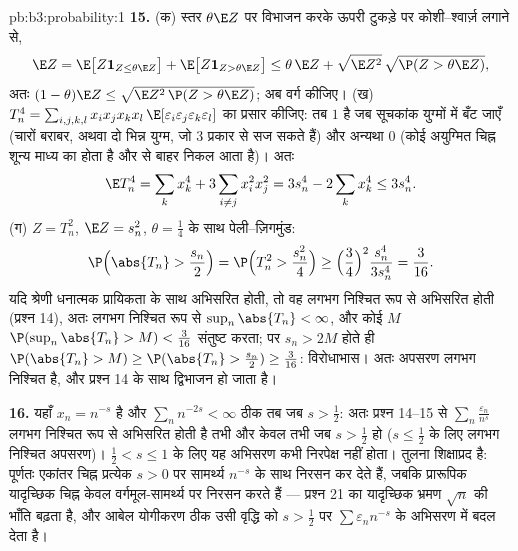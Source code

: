 \begin{solution}{pb:b3:probability:1}
\textbf{15.} (क) स्तर $\theta\E Z$ पर विभाजन करके ऊपरी
टुकड़े पर कोशी--श्वार्ज़ लगाने से,
\[
\E Z = \E\bigl[Z\mathbf 1_{Z \leq \theta\E Z}\bigr] +
\E\bigl[Z\mathbf 1_{Z > \theta\E Z}\bigr]
\leq \theta\,\E Z + \sqrt{\E Z^2}\,
\sqrt{\P(Z > \theta\E Z)} ,
\]
अतः $(1 - \theta)\E Z \leq \sqrt{\E Z^2\,\P(Z > \theta\E
Z)}$; अब वर्ग कीजिए। (ख) $T_n^4 =
\sum_{i,j,k,l}x_ix_jx_kx_l\,
\E[\varepsilon_i\varepsilon_j\varepsilon_k\varepsilon_l]$
का प्रसार कीजिए:  तब $1$ है जब सूचकांक युग्मों में
बँट जाएँ (चारों बराबर, अथवा दो भिन्न युग्म, जो $3$ प्रकार से
सज सकते हैं) और अन्यथा $0$ (कोई अयुग्मित चिह्न शून्य माध्य
का होता है और  से बाहर निकल आता है)। अतः
\[
\E T_n^4 = \sum_kx_k^4 + 3\sum_{i\neq j}x_i^2x_j^2 =
3s_n^4 - 2\sum_kx_k^4 \leq 3s_n^4 .
\]
(ग) $Z = T_n^2$, $\E Z = s_n^2$, $\theta = \frac14$ के साथ
पेली--ज़िगमुंड:
\[
\P\Bigl(\abs{T_n} > \frac{s_n}2\Bigr) = \P\Bigl(T_n^2 >
\frac{s_n^2}4\Bigr) \geq \Bigl(\frac34\Bigr)^2
\frac{s_n^4}{3s_n^4} = \frac3{16} .
\]
यदि श्रेणी धनात्मक प्रायिकता के साथ अभिसरित होती, तो वह लगभग
निश्चित रूप से अभिसरित होती (प्रश्न 14), अतः लगभग निश्चित
रूप से $\sup_n\abs{T_n} < \infty$, और कोई $M$
$\P(\sup_n\abs{T_n} > M) < \frac3{16}$ संतुष्ट करता; पर
$s_n > 2M$ होते ही $\P(\abs{T_n} > M) \geq \P(\abs{T_n} >
\frac{s_n}2) \geq \frac3{16}$: विरोधाभास। अतः अपसरण लगभग
निश्चित है, और प्रश्न 14 के साथ द्विभाजन  हो जाता है।

\textbf{16.} यहाँ $x_n = n^{-s}$ है और $\sum_nn^{-2s} <
\infty$ ठीक तब जब $s > \frac12$: अतः प्रश्न 14--15 से
$\sum_n\frac{\varepsilon_n}{n^s}$ लगभग निश्चित रूप से
अभिसरित होती है तभी और केवल तभी जब $s > \frac12$ हो ($s \leq
\frac12$ के लिए लगभग निश्चित अपसरण)। $\frac12 < s \leq 1$
के लिए यह अभिसरण कभी निरपेक्ष नहीं होता। तुलना शिक्षाप्रद
है: पूर्णतः एकांतर चिह्न प्रत्येक $s > 0$ पर सामर्थ्य $n^{-s}$
के साथ निरसन कर देते हैं, जबकि प्रारूपिक यादृच्छिक चिह्न
केवल वर्गमूल-सामर्थ्य पर निरसन करते हैं --- प्रश्न 21 का
यादृच्छिक भ्रमण $\sqrt n$ की भाँति बढ़ता है, और आबेल योगीकरण
ठीक उसी वृद्धि को $s > \frac12$ पर
$\sum\varepsilon_nn^{-s}$ के अभिसरण में बदल देता है।


\end{solution}
